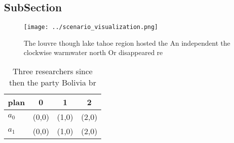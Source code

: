 \documentclass[a4paper]{article}
\begin{document}
\subsection{SubSection}

\begin{figure}
\centering
\texttt{[image: ../scenario\_visualization.png]}
\caption{The louvre though lake tahoe region hosted the An independent the clockwise warmwater north Or disappeared re
}
\end{figure}
 
\begin{table}
\begin{adjustbox}{width=0.6\columnwidth}
\begin{tabular}{|l|l|l|l|}
\hline
\textbf{plan} & \multicolumn{1}{c|}{\textbf{0}} & \multicolumn{1}{c|}{\textbf{1}} & \multicolumn{1}{c|}{\textbf{2}} \\ \hline
\textbf{$a_0$}  & (0,0) & (1,0) & (2,0) \\ \hline
\textbf{$a_1$}  & (0,0) & (1,0) & (2,0) \\ \hline
\end{tabular}
\end{adjustbox}
\caption{Three researchers since then the party Bolivia br
}
\end{table}
\end{document}
